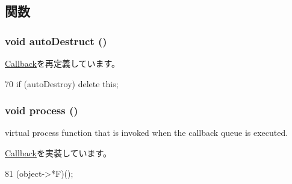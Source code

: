 \subsection{関数}
\hypertarget{classMakeCallback_ad57c93dcd984e5a596eb4a3f4236c93a}{
\subsubsection[{autoDestruct}]{\setlength{\rightskip}{0pt plus 5cm}void autoDestruct ()}}
\label{classMakeCallback_ad57c93dcd984e5a596eb4a3f4236c93a}


\hyperlink{classCallback_a6885801d71ec8b4040427994c5fd8dcf}{Callback}を再定義しています。


\begin{DoxyCode}
70 { if (autoDestroy) delete this; }
\end{DoxyCode}
\hypertarget{classMakeCallback_a2e9c5136d19b1a95fc427e0852deab5c}{
\subsubsection[{process}]{\setlength{\rightskip}{0pt plus 5cm}void process ()}}
\label{classMakeCallback_a2e9c5136d19b1a95fc427e0852deab5c}
virtual process function that is invoked when the callback queue is executed. 

\hyperlink{classCallback_a142b75b68a6291400e20fb0dd905b1c8}{Callback}を実装しています。


\begin{DoxyCode}
81 { (object->*F)(); }
\end{DoxyCode}


